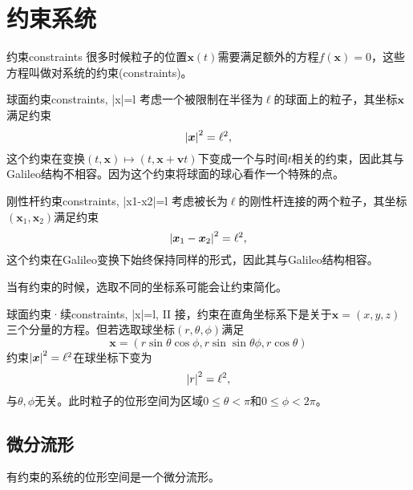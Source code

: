 \section{约束系统}

\begin{definition}{约束}{constraints}
    很多时候粒子的位置$\bm x(t)$需要满足额外的方程$f(\bm x)=0$，这些方程叫做对系统的约束(constraints)。
\end{definition}
\begin{example}{球面约束}{constraints, |x|=l}
    考虑一个被限制在半径为$\ell$的球面上的粒子，其坐标$\bm x$满足约束
    \[
        \left\lvert\bm x\right\rvert^2=\ell^2,
    \]
    这个约束在变换$(t,\bm x)\mapsto(t,\bm x+\bm vt)$下变成一个与时间$t$相关的约束，因此其与Galileo结构不相容。因为这个约束将球面的球心看作一个特殊的点。
\end{example}
\begin{example}{刚性杆约束}{constraints, |x1-x2|=l}
    考虑被长为$\ell$的刚性杆连接的两个粒子，其坐标$(\bm x_1,\bm x_2)$满足约束
    \[
        \left\lvert\bm x_1-\bm x_2\right\rvert^2=\ell^2,
    \]
    这个约束在Galileo变换下始终保持同样的形式，因此其与Galileo结构相容。
\end{example}
当有约束的时候，选取不同的坐标系可能会让约束简化。
\begin{example}{球面约束·续}{constraints, |x|=l, II}
    接，约束在直角坐标系下是关于$\bm x=(x,y,z)$三个分量的方程。但若选取球坐标$(r,\theta,\phi)$满足
    \[
        \bm x=(r\sin\theta\cos\phi,r\sin\sin\theta\phi,r\cos\theta)
    \]
    约束$\left\lvert\bm x\right\rvert^2=\ell^2$在球坐标下变为
    \[
        \left\lvert r\right\rvert^2=\ell^2,
    \]
    与$\theta,\phi$无关。此时粒子的位形空间为区域$0\leq\theta<\pi$和$0\leq\phi<2\pi$。
\end{example}

\subsection{微分流形}

有约束的系统的位形空间是一个微分流形。

